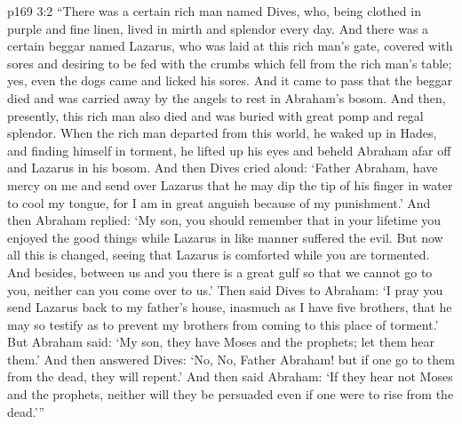 \vs p169 3:2 “There was a certain rich man named Dives, who, being clothed in purple and fine linen, lived in mirth and splendor every day. And there was a certain beggar named Lazarus, who was laid at this rich man’s gate, covered with sores and desiring to be fed with the crumbs which fell from the rich man’s table; yes, even the dogs came and licked his sores. And it came to pass that the beggar died and was carried away by the angels to rest in Abraham’s bosom. And then, presently, this rich man also died and was buried with great pomp and regal splendor. When the rich man departed from this world, he waked up in Hades, and finding himself in torment, he lifted up his eyes and beheld Abraham afar off and Lazarus in his bosom. And then Dives cried aloud: ‘Father Abraham, have mercy on me and send over Lazarus that he may dip the tip of his finger in water to cool my tongue, for I am in great anguish because of my punishment.’ And then Abraham replied: ‘My son, you should remember that in your lifetime you enjoyed the good things while Lazarus in like manner suffered the evil. But now all this is changed, seeing that Lazarus is comforted while you are tormented. And besides, between us and you there is a great gulf so that we cannot go to you, neither can you come over to us.’ Then said Dives to Abraham: ‘I pray you send Lazarus back to my father’s house, inasmuch as I have five brothers, that he may so testify as to prevent my brothers from coming to this place of torment.’ But Abraham said: ‘My son, they have Moses and the prophets; let them hear them.’ And then answered Dives: ‘No, No, Father Abraham! but if one go to them from the dead, they will repent.’ And then said Abraham: ‘If they hear not Moses and the prophets, neither will they be persuaded even if one were to rise from the dead.’”

